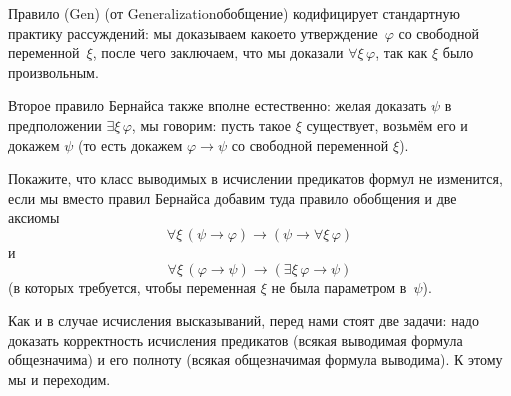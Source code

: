 Правило (Gen) (от Generalization\т обобщение) кодифицирует
стандартную практику рассуждений: мы доказываем какое\д то
утверждение~$\varphi$ со свободной переменной~$\xi$, после чего
заключаем, что мы доказали $\forall\xi\,\varphi$, так как $\xi$
было произвольным.

Второе правило Бернайса также вполне естественно: желая
доказать $\psi$ в предположении $\exists\xi\,\varphi$,
мы говорим: пусть такое $\xi$ существует, возьмём его
и докажем $\psi$ (то есть докажем $\varphi\to\psi$
со свободной переменной $\xi$).

\begin{problem}
Покажите, что класс выводимых в исчислении предикатов формул не
изменится, если мы вместо правил Бернайса добавим туда правило
обобщения и две аксиомы
        $$
\forall \xi\, (\psi\to\varphi) \to
(\psi \to \forall \xi\, \varphi)
        $$
и
        $$
\forall \xi\, (\varphi\to\psi) \to
(\exists\xi\, \varphi\to\psi)
        $$
(в которых требуется, чтобы переменная $\xi$ не была параметром в~$\psi$).
\end{problem}

Как и в случае исчисления высказываний, перед нами стоят две
задачи: надо доказать корректность исчисления предикатов (всякая
выводимая формула общезначима) и его полноту (всякая
общезначимая формула выводима). К этому мы и переходим.
